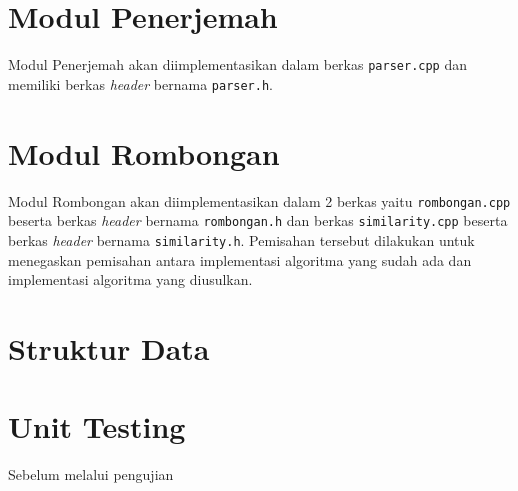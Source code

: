 \section{Modul Penerjemah}
\label{sec:impl-parser}

Modul Penerjemah akan diimplementasikan dalam berkas \texttt{parser.cpp} dan memiliki berkas \textit{header} bernama \texttt{parser.h}. 

\section{Modul Rombongan}
\label{sec:impl-rombongan}

Modul Rombongan akan diimplementasikan dalam 2 berkas yaitu \texttt{rombongan.cpp} beserta berkas \textit{header} bernama \texttt{rombongan.h} dan berkas \texttt{similarity.cpp} beserta berkas \textit{header} bernama \texttt{similarity.h}. Pemisahan tersebut dilakukan untuk menegaskan pemisahan antara implementasi algoritma yang sudah ada dan implementasi algoritma yang diusulkan.

\section{Struktur Data}
\label{sec:impl-struct}

\section{Unit Testing}
\label{sec:unit-test}

Sebelum melalui pengujian 